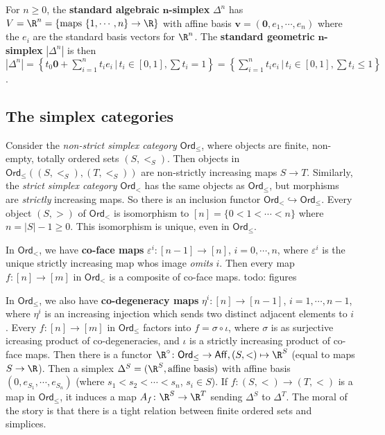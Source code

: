 \begin{definition}[]
    For $n\geq 0$, the \textbf{standard algebraic} $\mathbf n$\textbf{-simplex} $\Delta ^n $ has $V=\R^n =\{ \text{maps} \ \{1,\cdots ,n\} \to \R\} $ with affine basis $\mathbf v=(\mathbf 0,e_1,\cdots ,e_n )$ where the $e_i $ are the standard basis vectors for $\R^n $. The \textbf{standard geometric} $\mathbf n$\textbf{-simplex} $|\Delta ^n |$ is then $|\Delta ^n |= \left\{ t_0 \mathbf 0+ \sum_{i=1}^{n} t_i e_i \,\big|\,t_i  \in [0,1], \sum t_i =1\right\}=\left\{ \sum_{i=1}^{n} t_i e_i \,\big|\,t_i  \in [0,1], \sum t_i \leq1\right\} $.
\end{definition}
\subsection{The simplex categories}
Consider the \emph{non-strict simplex category} $\mathsf{Ord} _{\leq}$, where objects are finite, non-empty, totally ordered sets $(S, <_S)$. Then objects in $\mathsf{Ord} _{\leq}((S,<_S),(T,<_S))$ are non-strictly increasing maps $S \to T$. Similarly, the \emph{strict simplex category} $\mathsf{Ord} _<$ has the same objects as $\mathsf{Ord} _{\leq}$, but morphisms are \emph{strictly} increasing maps. So there is an inclusion functor $\mathsf{Ord} _< \hookrightarrow \mathsf{Ord} _{\leq}$. Every object $(S,>)$ of $\mathsf{Ord} _<$ is isomorphism to $[n]= \{0<1<\cdots <n\} $ where $n=|S|-1\geq 0$. This isomorphism is unique, even in $\mathsf{Ord} _{\leq}$.

In $\mathsf{Ord} _<$, we have \textbf{co-face maps} $\varepsilon ^i  \colon [n-1] \to [n]$, $i=0,\cdots ,n$, where $\varepsilon ^i $ is the unique strictly increasing map whos image \emph{omits} $i$.  Then every map $f \colon [n] \to [m]$ in $\mathsf{Ord} _<$ is a composite of co-face maps. {\color{red}todo: figures}

In $\mathsf{Ord} _{\leq}$, we also have \textbf{co-degeneracy maps} $\eta ^i  \colon [n] \to [n-1]$, $i=1, \cdots ,n-1$, where $\eta^i $ is an increasing injection which sends two distinct adjacent elements to $i$. Every $f \colon [n] \to [m]$ in $\mathsf{Ord} _{\leq }$ factors into $f= \sigma \circ \iota$, where $\sigma$ is as surjective icreasing product of co-degeneracies, and $\iota$ is a strictly increasing product of co-face maps. Then there is a functor $\R ^{\circ } \colon \mathsf{Ord} _{\leq} \to \mathsf{Aff} , (S,<) \mapsto \R^S $ (equal to maps $S \to \R$). Then a simplex $\Delta ^S=(\R^S,\text{affine basis} )$ with affine basis $(0, e_{S_1 },\cdots ,e_{S_n })$ (where $s_1< s_2< \cdots <s_n $, $s_i  \in S$). If $f \colon (S,<) \to (T,<)$ is a map in $\mathsf{Ord} _{\leq}$, it induces a map $A_f \colon \R^S \to \R^T$ sending $\Delta ^S $ to $\Delta ^T$. The moral of the story is that there is a tight relation between finite ordered sets and simplices.

